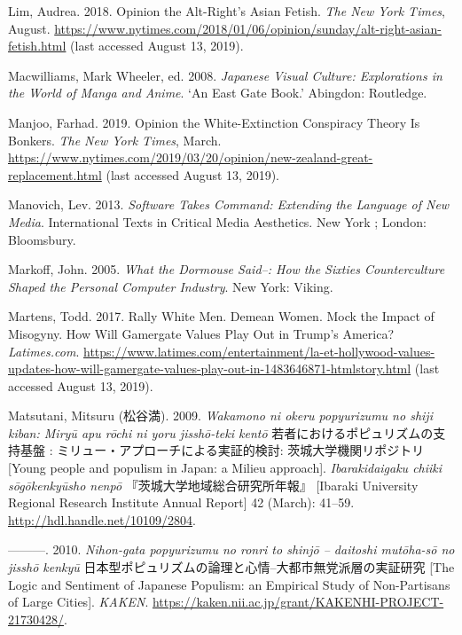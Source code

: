 \documentclass[10pt,british,A4paper,twoside]{memoir}
\begin{document}
\hypertarget{ref-lim_opinion_2018}{}
Lim, Audrea. 2018. Opinion the Alt-Right's Asian Fetish. \emph{The New
York Times}, August.
\url{https://www.nytimes.com/2018/01/06/opinion/sunday/alt-right-asian-fetish.html} (last accessed August 13, 2019).

\hypertarget{ref-macwilliams_japanese_2008}{}
Macwilliams, Mark Wheeler, ed. 2008. \emph{Japanese Visual Culture:
Explorations in the World of Manga and Anime}. `An East Gate Book.'
Abingdon: Routledge.

\hypertarget{ref-manjoo_opinion_2019}{}
Manjoo, Farhad. 2019. Opinion the White-Extinction Conspiracy Theory Is
Bonkers. \emph{The New York Times}, March.
\url{https://www.nytimes.com/2019/03/20/opinion/new-zealand-great-replacement.html} (last accessed August 13, 2019).

\hypertarget{ref-manovich_software_2013}{}
Manovich, Lev. 2013. \emph{Software Takes Command: Extending the
Language of New Media}. International Texts in Critical Media
Aesthetics. New York ; London: Bloomsbury.

\hypertarget{ref-markoff_what_2005}{}
Markoff, John. 2005. \emph{What the Dormouse Said--: How the Sixties
Counterculture Shaped the Personal Computer Industry}. New York: Viking.

\hypertarget{ref-martens_rally_2017}{}
Martens, Todd. 2017. Rally White Men. Demean Women. Mock the Impact of
Misogyny. How Will Gamergate Values Play Out in Trump's America?
\emph{Latimes.com}.
\url{https://www.latimes.com/entertainment/la-et-hollywood-values-updates-how-will-gamergate-values-play-out-in-1483646871-htmlstory.html} (last accessed August 13, 2019).

\hypertarget{ref-matsutani__2009}{}
Matsutani, Mitsuru (松谷満). 2009. \emph{Wakamono ni okeru popyurizumu no shiji kiban: Miryū apu rōchi ni yoru jisshō-teki kentō} 若者におけるポピュリズムの支持基盤 : ミリュー・アプローチによる実証的検討: 茨城大学機関リポジトリ [Young people and populism in Japan: a Milieu approach].
\emph{Ibarakidaigaku chiiki sōgōkenkyūsho nenpō
} 『茨城大学地域総合研究所年報』 [Ibaraki University Regional Research Institute Annual Report] 42 (March): 41--59.
\url{http://hdl.handle.net/10109/2804}.

\hypertarget{ref-matsutani_eng:_2010}{}
---------. 2010. \emph{Nihon-gata popyurizumu no ronri to shinjō -- daitoshi mutōha-sō no jisshō kenkyū} 日本型ポピュリズムの論理と心情--大都市無党派層の実証研究 [The Logic and Sentiment of Japanese Populism: an Empirical Study of Non-Partisans of Large Cities]. \emph{KAKEN}.
\url{https://kaken.nii.ac.jp/grant/KAKENHI-PROJECT-21730428/}.
\end{document}

